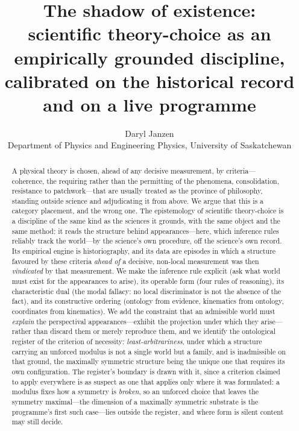 \documentclass[11pt,a4paper]{article}
\title{The shadow of existence:\\
\large scientific theory-choice as an empirically grounded discipline,\\
calibrated on the historical record and on a live programme}
\author{Daryl Janzen\\
\small Department of Physics and Engineering Physics, University of Saskatchewan}
\date{}
\begin{document}
\maketitle

\begin{abstract}
A physical theory is chosen, ahead of any decisive measurement, by criteria---coherence, the requiring rather than the permitting of the phenomena,
consolidation, resistance to patchwork---that are usually treated as the province of philosophy, standing outside science and adjudicating it from
above. We argue that this is a category placement, and the wrong one. The epistemology of scientific theory-choice is a discipline of the same kind
as the sciences it grounds, with the same object and the same method: it reads the structure behind appearances---here, which inference rules
reliably track the world---by the science's own procedure, off the science's own record. Its empirical engine is historiography, and its data are
episodes in which a structure favoured by these criteria \emph{ahead of} a decisive, non-local measurement was then \emph{vindicated} by that
measurement. We make the inference rule explicit (ask what world must exist for the appearances to arise), its operable form (four rules of
reasoning), its characteristic dual (the modal fallacy: no local discriminator is not the absence of the fact), and its constructive ordering
(ontology from evidence, kinematics from ontology, coordinates from kinematics). We add the constraint that an admissible world must \emph{explain}
the perspectival appearances---exhibit the projection under which they arise---rather than discard them or merely reproduce them, and we identify the
ontological register of the criterion of necessity: \emph{least-arbitrariness}, under which a structure carrying an unforced modulus is not a single
world but a family, and is inadmissible on that ground, the maximally symmetric structure being the unique one that requires its own configuration. The register's boundary is drawn with it, since a criterion claimed to apply everywhere is as suspect as one that applies only where it was formulated: a modulus fixes how a symmetry is \emph{broken}, so an unforced choice that leaves the symmetry maximal---the dimension of a maximally symmetric substrate is the programme's first such case---lies outside the register, and where form is silent content may still decide.


\end{abstract}
\end{document}
